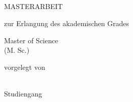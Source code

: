 
\renewcommand{\today}{\ifnum\number\day<10 0\fi \number\day.\space%
\ifcase \month \or Januar \or Februar \or März \or April \or Mai %
\or Juni \or Juli \or August \or September \or Oktober \or November \or Dezember \fi %
\number \year}

\begin{titlepage}
	\begin{addmargin}[-1cm]{-3cm}
    \begin{center}
        \large
		
		\myUni \\ \vspace{0.6em} \myFaculty \\ \vspace{0.6em} \myDepartment{} \\

        \hfill

        \vfill

        \begingroup
            \color{Maroon}\LARGE{\spacedallcaps{\myTitle}} \\ \bigskip
        \endgroup


        \vfill \bigskip

        {\Huge MASTERARBEIT} \vfill\medskip

        zur Erlangung des akademischen Grades \\\vfill

        {\LARGE Master of Science}\\
        (M. Sc.)\\\vfill


		vorgelegt von\\\vfill

        \textbf{\myName}\\
		Studiengang \mySubject{}\vfill%



\end{center}
\end{addmargin}
\end{titlepage}
